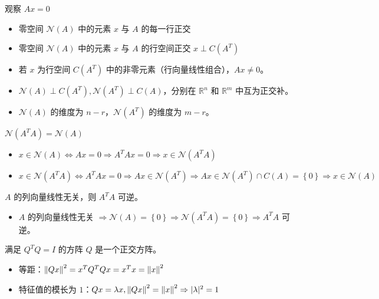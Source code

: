 \begin{remark}
    观察 $Ax = 0$
    \begin{itemize}
        \item 零空间 $\mathcal{N}(A)$ 中的元素 $x$ 与 $A$ 的每一行正交
        \item 零空间 $\mathcal{N}(A)$ 中的元素 $x$ 与 $A$ 的行空间正交 $x \perp C(A^T)$
        \item 若 $x$ 为行空间 $C(A^T)$ 中的非零元素（行向量线性组合），$Ax \neq 0$。
        \item $\mathcal{N}(A) \perp C(A^T), \mathcal{N}(A^T) \perp C(A)$，分别在 $\mathbb{R}^n$ 和 $\mathbb{R}^m$ 中互为正交补。
        \item $\mathcal{N}(A)$ 的维度为 $n - r$，$\mathcal{N}(A^T)$ 的维度为 $m - r$。
    \end{itemize}
\end{remark}

\begin{remark}
	$\mathcal{N}(A^TA) = \mathcal{N}(A)$
	\begin{itemize}
		\item $x\in\mathcal{N}(A) \Leftrightarrow Ax=0 \Rightarrow A^TAx=0 \Rightarrow x \in \mathcal{N}(A^TA)$
		\item $x \in \mathcal{N}(A^TA)\Leftrightarrow A^TAx = 0 \Rightarrow Ax \in \mathcal{N}(A^T) \Rightarrow Ax \in \mathcal{N}(A^T)\cap C(A)=\left\{0\right\} \Rightarrow x\in \mathcal{N}(A)$
	\end{itemize}
\end{remark}

\begin{remark}
	$A$ 的列向量线性无关，则 $A^TA$ 可逆。
	\begin{itemize}
		\item $A$ 的列向量线性无关 $\Rightarrow \mathcal{N}(A) = \left\{0\right\}\Rightarrow \mathcal{N}(A^TA) = \left\{0\right\}\Rightarrow A^TA$ 可逆。
	\end{itemize}
\end{remark}

\begin{remark}
    满足 $Q^TQ = I$ 的方阵 $Q$ 是一个正交方阵。
    \begin{itemize}
        \item 等距：$\norm{Qx}^2 = x^TQ^TQx = x^Tx = \norm{x}^2$
        \item 特征值的模长为 $1$：$Qx = \lambda x, \norm{Qx}^2 = \norm{x}^2\Rightarrow |\lambda|^2 = 1$
    \end{itemize}
\end{remark}


